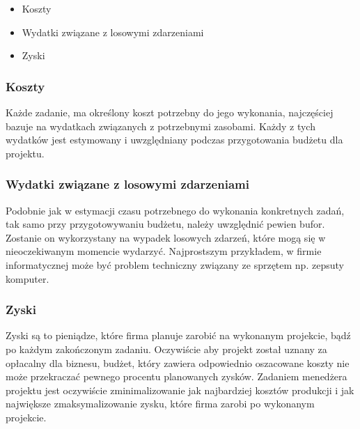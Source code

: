 \documentclass[oneside,polski,logo]{amuthesis}
\begin{document}
\begin{itemize}
	\item Koszty
	\item Wydatki związane z losowymi zdarzeniami
	\item Zyski
\end{itemize}

\subsubsection {Koszty}
Każde zadanie, ma określony koszt potrzebny do jego wykonania, najczęściej bazuje na wydatkach związanych z potrzebnymi zasobami. Każdy z tych wydatków jest estymowany i uwzględniany podczas przygotowania budżetu dla projektu.

\subsubsection {Wydatki związane z losowymi zdarzeniami}
Podobnie jak w estymacji czasu potrzebnego do wykonania konkretnych zadań, tak samo przy przygotowywaniu budżetu, należy uwzględnić pewien bufor. Zostanie on wykorzystany na wypadek losowych zdarzeń, które mogą się w nieoczekiwanym momencie wydarzyć. Najprostszym przykładem, w firmie informatycznej może być problem techniczny związany ze sprzętem np. zepsuty komputer.

\subsubsection {Zyski}
Zyski są to pieniądze, które firma planuje zarobić na wykonanym projekcie, bądź po każdym zakończonym zadaniu. Oczywiście aby projekt został uznany za opłacalny dla biznesu, budżet, który zawiera odpowiednio oszacowane koszty nie może przekraczać pewnego procentu planowanych zysków. Zadaniem menedżera projektu jest oczywiście zminimalizowanie jak najbardziej kosztów produkcji i jak największe zmaksymalizowanie zysku, które firma zarobi po wykonanym projekcie.
\end{document}
